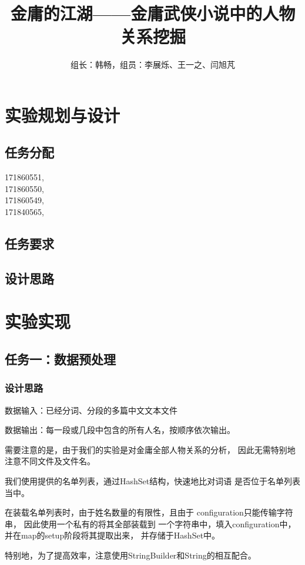 \documentclass[a4paper,UTF8]{article}
\author{组长：韩畅，组员：李展烁、王一之、闫旭芃}
\numberwithin{equation}{section}
\begin{document}
{}
\title{金庸的江湖——金庸武侠小说中的人物关系挖掘}
\maketitle

\section{实验规划与设计}
\subsection{任务分配}
{171860551, }\\ \indent
{171860550, }\\ \indent
{171860549, }\\ \indent
{171840565, }
\subsection{任务要求}

\subsection{设计思路}


\section{实验实现}
\subsection{任务一：数据预处理}
\subsubsection{设计思路}
数据输入：已经分词、分段的多篇中文文本文件
\par 数据输出：每一段或几段中包含的所有人名，按顺序依次输出。
\par 需要注意的是，由于我们的实验是对金庸全部人物关系的分析，
因此无需特别地注意不同文件及文件名。
\par 我们使用提供的名单列表，通过HashSet结构，快速地比对词语
是否位于名单列表当中。
\par 在装载名单列表时，由于姓名数量的有限性，且由于
configuration只能传输字符串，
因此使用一个私有的将其全部装载到
一个字符串中，填入configuration中，
并在map的setup阶段将其提取出来，
并存储于HashSet中。
\par 特别地，为了提高效率，注意使用StringBuilder和String的相互配合。
\end{document}
